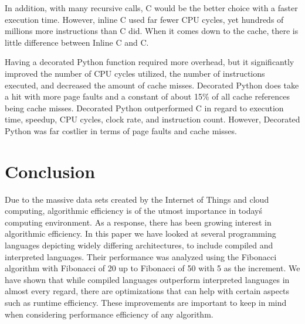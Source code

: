 \documentclass{sig-alternate}
\begin{document}
In addition, with many recursive calls, C would be the better choice with a faster execution time. However, inline C used far fewer CPU cycles, yet hundreds of millions more instructions than C did. When it comes down to the cache, there is little difference between Inline C and C.

Having a decorated Python function required more overhead, but it significantly improved the number of CPU cycles utilized, the number of instructions executed, and decreased the amount of cache misses. Decorated Python does take a hit with more page faults and a constant of about 15\% of all cache references being cache misses. Decorated Python outperformed C in regard to execution time, speedup, CPU cycles, clock rate, and instruction count. However, Decorated Python was far costlier in terms of page faults and cache misses.

\section{Conclusion}

Due to the massive data sets created by the Internet of Things and cloud computing, algorithmic efficiency is of the utmost importance in today\'s computing environment. As a response, there has been growing interest in algorithmic efficiency. In this paper we have looked at several programming languages depicting widely differing architectures, to include compiled and interpreted languages. Their performance was analyzed using the Fibonacci algorithm with Fibonacci of 20 up to Fibonacci of 50 with 5 as the increment. We have shown that while compiled languages outperform interpreted languages in almost every regard, there are optimizations that can help with certain aspects such as runtime efficiency. These improvements are important to keep in mind when considering performance efficiency of any algorithm.







\end{document}
